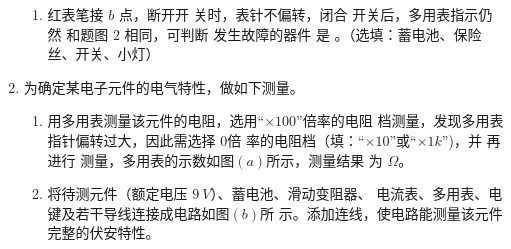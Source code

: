 \begin{enumerate}
\begin{enumerate}
\item 
红表笔接 $ b $ 点，断开开
关时，表针不偏转，闭合
开关后，多用表指示仍然
和题图 $ 2 $ 相同，可判断
发生故障的器件
是 \underlinegap 。（选填：蓄电池、保险丝、开关、小灯）


\end{enumerate}



\item 
{}
为确定某电子元件的电气特性，做如下测量。
\begin{figure}[h!]
\centering
\begin{subfigure}{0.4\linewidth}
\centering
 
\caption{}\label{}
\end{subfigure}
\begin{subfigure}{0.4\linewidth}
\centering
 
\caption{}\label{}
\end{subfigure}
\end{figure}

\begin{enumerate}
\item
用多用表测量该元件的电阻，选用“$ \times 100 $”倍率的电阻
档测量，发现多用表指针偏转过大，因此需选择 \underlinegap 0倍
率的电阻档（填：“$ \times 10 $”或“$ \times 1k $”)，并 \underlinegap 再进行
测量，多用表的示数如图$ (a) $所示，测量结果
为 \underlinegap 
$ \Omega $。




\item 
将待测元件（额定电压 $ 9 \ V $）、蓄电池、滑动变阻器、
电流表、多用表、电键及若干导线连接成电路如图$ (b) $所
示。添加连线，使电路能测量该元件完整的伏安特性。




\end{enumerate}
\end{enumerate}
